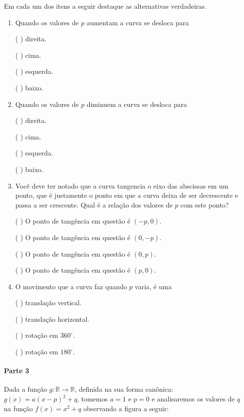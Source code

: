 \documentclass[10 pt,usenames,dvipsnames, oneside]{article}
\begin{document}
Em cada um dos itens a seguir destaque as alternativas verdadeiras.
\begin{enumerate}
\item {} 
Quando os valores de \(p\) aumentam a curva se desloca para

({ }{ }{ }) direita.

({ }{ }{ }) cima.

({ }{ }{ }) esquerda.

({ }{ }{ }) baixo.

\item {} 
Quando os valores de \(p\) diminuem a curva se desloca para

({ }{ }{ }) direita.

({ }{ }{ }) cima.

({ }{ }{ }) esquerda.

({ }{ }{ }) baixo.

\item {} 
Você deve ter notado que a curva tangencia o eixo das abscissas em um ponto, que é justamente o ponto em que a curva deixa de ser decrescente e passa a ser crescente. Qual é a relação dos valores de \(p\) com este ponto?

({ }{ }{ }) O ponto de tangência em questão é \((-p,0)\).

({ }{ }{ }) O ponto de tangência em questão é \((0,-p)\).

({ }{ }{ }) O ponto de tangência em questão é \((0,p)\).

({ }{ }{ }) O ponto de tangência em questão é \((p,0)\).

\item {} 
O movimento que a curva faz quando \(p\) varia, é uma

({ }{ }{ }) translação vertical.

({ }{ }{ }) translação horizontal.

({ }{ }{ }) rotação em \(360^{\circ}\).

({ }{ }{ }) rotação em \(180^{\circ}\).

\end{enumerate}

\clearpage

\paragraph{Parte 3}

Dada a função \(g:\mathbb{R}\to\mathbb{R}\), definida na sua forma canônica: \(g(x)=a(x-p)^2+q\), tomemos \(a=1\) e \(p=0\) e analisaremos os valores de \(q\) na função \(f(x)=x^2+q\) observando a figura a seguir:
\end{document}
